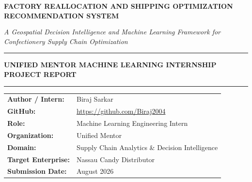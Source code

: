 \documentclass[12pt]{article}
\begin{document}
\begin{titlepage}
    \centering
    \vspace*{0.8cm}
    
    {\fontsize{21}{26}\selectfont\bfseries FACTORY REALLOCATION AND SHIPPING OPTIMIZATION RECOMMENDATION SYSTEM\par}
    
    \vspace{0.6cm}
    {\fontsize{14}{18}\selectfont\textit{A Geospatial Decision Intelligence and Machine Learning Framework for Confectionery Supply Chain Optimization}\par}
    
    \vspace{1.2cm}
    \rule{\linewidth}{1.0pt}
    \vspace{0.4cm}
    
    {\fontsize{13}{16}\selectfont\textbf{UNIFIED MENTOR MACHINE LEARNING INTERNSHIP PROJECT REPORT}\par}
    
    \vspace{0.4cm}
    \rule{\linewidth}{1.0pt}
    
    \vspace{2.2cm}
    
    \begin{tabular}{ll}
        \textbf{Author / Intern:} & Biraj Sarkar \\
        \textbf{GitHub:} & \href{https://github.com/Biraj2004}{https://github.com/Biraj2004} \\
        \textbf{Role:} & Machine Learning Engineering Intern \\
        \textbf{Organization:} & Unified Mentor \\
        \textbf{Domain:} & Supply Chain Analytics \& Decision Intelligence \\
        \textbf{Target Enterprise:} & Nassau Candy Distributor \\
        \textbf{Submission Date:} & August 2026 \\
    \end{tabular}
    

\end{titlepage}
\end{document}
